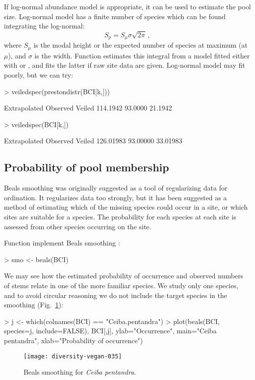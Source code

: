 \documentclass[a4paper,10pt,twocolumn]{article}
\begin{document}
If log-normal abundance model is appropriate, it can be used to
estimate the pool size.  Log-normal model has a finite number of
species which can be found integrating the log-normal:
\begin{equation}
S_p = S_\mu \sigma \sqrt{2 \pi} \,,
\end{equation}
where $S_\mu$ is the modal height or the expected number of species at
maximum (at $\mu$), and $\sigma$ is the width.  Function
 estimates this integral from a model fitted either
with  or , and fits the latter
if raw site data are given.  Log-normal model may fit poorly, but we
can try:
\begin{Schunk}
\begin{Sinput}
> veiledspec(prestondistr(BCI[k,]))
\end{Sinput}
\begin{Soutput}
Extrapolated     Observed       Veiled 
    114.1942      93.0000      21.1942 
\end{Soutput}
\begin{Sinput}
> veiledspec(BCI[k,])
\end{Sinput}
\begin{Soutput}
Extrapolated     Observed       Veiled 
   126.01983     93.00000     33.01983 
\end{Soutput}
\end{Schunk}

\subsection{Probability of pool membership}

Beals smoothing was originally suggested as a tool of regularizing data
for ordination.  It regularizes data too strongly,
but it has been suggested as a method of estimating which of the
missing species could occur in a site, or which sites are suitable for
a species.  The probability for each species at each site is assessed
from other species occurring on the site.

Function  implement Beals smoothing \citep{McCune87,
  DeCaceresLegendre08}:
\begin{Schunk}
\begin{Sinput}
> smo <- beals(BCI)
\end{Sinput}
\end{Schunk}
We may see how the estimated probability of occurrence and observed
numbers of stems relate in one of the more familiar species. We study
only one species, and to avoid circular reasoning we do not include
the target species in the smoothing (Fig.~\ref{fig:beals}):
\begin{Schunk}
\begin{Sinput}
> j <- which(colnames(BCI) == "Ceiba.pentandra")
> plot(beals(BCI, species=j, include=FALSE), BCI[,j], 
       ylab="Occurrence", main="Ceiba pentandra", 
       xlab="Probability of occurrence")
\end{Sinput}
\end{Schunk}
\begin{figure}
\texttt{[image: diversity-vegan-035]}
\caption{Beals smoothing for \emph{Ceiba pentandra}.}
\label{fig:beals}
\end{figure}


\end{document}
